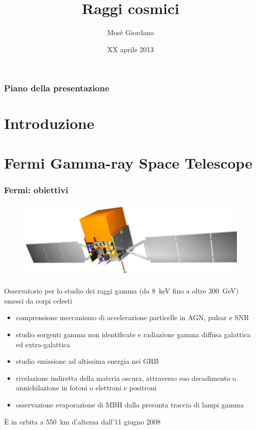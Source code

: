 \documentclass[utf8,9pt]{beamer}
\title{Raggi cosmici}
\author{Mosè Giordano}
\date{XX aprile 2013}
\institute[UniSalento]{Università del Salento}
\begin{document}
\begin{frame}
  \maketitle
\end{frame}

\begin{frame}
  \frametitle{Piano della presentazione}
  \tableofcontents
\end{frame}

\section[Intro]{Introduzione}

\begin{frame}
  \frametitle{}
  
\end{frame}

\section[Fermi]{Fermi Gamma-ray Space Telescope}

\begin{frame}
  \frametitle{Fermi: obiettivi}
  \begin{figure}
    \centering
    \includegraphics[width=0.5\columnwidth]{glast.jpg}
  \end{figure}
  Osservatorio per lo studio dei raggi gamma (da \SI{8}{\kilo\electronvolt} fino
  a oltre \SI{300}{\giga\electronvolt}) emessi da corpi celesti
  \begin{itemize}
  \item comprensione meccanismo di accelerazione particelle in AGN, pulsar e SNR
  \item studio sorgenti gamma non identificate e radiazione gamma diffusa
    galattica ed extra-galattica
  \item studio emissione ad altissima energia nei GRB
  \item rivelazione indiretta della materia oscura, attraverso suo decadimento o
    annichilazione in fotoni o elettroni e positroni
  \item osservazione evaporazione di MBH dalla presunta traccia di lampi gamma
  \end{itemize}
  È in orbita a \SI{550}{\kilo\metre} d'altezza dall'11 giugno 2008
\end{frame}
\end{document}
